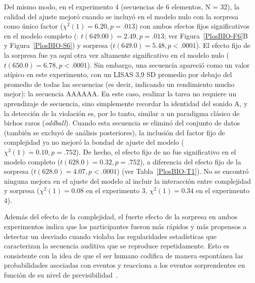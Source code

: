 Del mismo modo, en el experimento 4 (secuencias de 6 elementos, N = 32), la calidad del ajuste mejoró cuando \mdlbin se incluyó en el modelo nulo con la sorpresa como único factor ($\chi^2(1) = 6.20, p= .013$) con ambos efectos fijos significativos en el modelo completo (\mdlbin: $t (649.00) = 2.49, p= .013$; ver Figura~\ref{PlosBIO-F6}B y Figura~\ref{PlosBIO-S6}) y sorpresa ($t (649.0) = 5.4 8, p < .0001$). El efecto fijo de la sorpresa fue ya aquí otra vez altamente significativo en el modelo nulo ($t (650.0) = 6.78, p < .0001$). Sin embargo, una secuencia apareció como un valor atípico en este experimento, con un LISAS 3,9 SD promedio por debajo del promedio de todas las secuencias (es decir, indicando un rendimiento mucho mejor): la secuencia AAAAAA. En este caso, realizar la tarea no requiere un aprendizaje de secuencia, sino simplemente recordar la identidad del sonido A, y la detección de la violación es, por lo tanto, similar a un paradigma clásico de bichos raros (\textit{oddball}). Cuando esta secuencia se eliminó del conjunto de datos (también se excluyó de análisis posteriores), la inclusión del factor fijo de complejidad ya no mejoró la bondad de ajuste del modelo ($\chi^2 (1) = 0.10, p = .752$). De hecho, el efecto fijo de \mdlbin no fue significativo en el modelo completo ($t (628.0) = 0.32, p = .752$), a diferencia del efecto fijo de la sorpresa ($t (628.0) = 4.07, p < .0001$) (ver Tabla~\ref{PlosBIO-T1}). No se encontró ninguna mejora en el ajuste del modelo al incluir la interacción entre complejidad y sorpresa ($\chi^2(1) = 0.08$ en el experimento 3, $\chi^2(1) = 0.34$ en el experimento 4).


Además del efecto de la complejidad, el fuerte efecto de la sorpresa en ambos experimentos indica que los participantes fueron más rápidos y más propensos a detectar un desviado cuando violaba las regularidades estadísticas que caracterizan la secuencia auditiva que se reproduce repetidamente. Esto es consistente con la idea de que el ser humano codifica de manera espontánea las probabilidades asociadas con eventos y reacciona a los eventos sorprendentes en función de su nivel de previsibilidad~\cite{f19,f22}.

